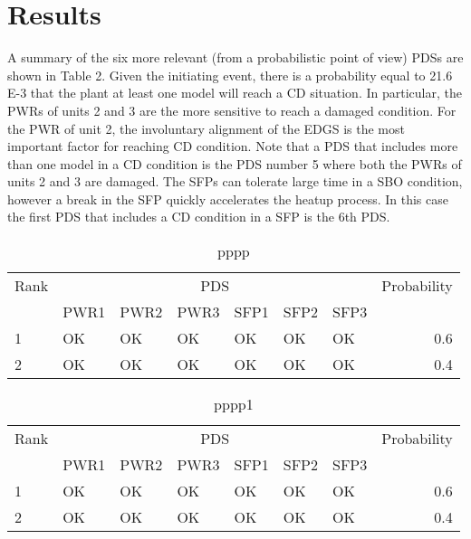 \section{Results}
\label{sec:results}

A summary of the six more relevant (from a probabilistic point of view) PDSs are shown in Table 2. 
Given the initiating event, there is a probability equal to 21.6 E-3 that the plant at least one model 
will reach a CD situation. In particular, the PWRs of units 2 and 3 are the more sensitive to reach a 
damaged condition. For the PWR of unit 2, the involuntary alignment of the EDGS is the most important 
factor for reaching CD condition.
Note that a PDS that includes more than one model in a CD condition is the PDS number 5 where both the 
PWRs of units 2 and 3 are damaged.
The SFPs can tolerate large time in a SBO condition, however a break in the SFP quickly accelerates 
the heatup process. In this case the first PDS that includes a CD condition in a SFP is the 6th PDS.

\begin{table}
  \centering
  \begin{tabular}{lllllllr}
    \hline
    Rank & \multicolumn{6}{c}{PDS} & Probability           \\
    \cline{2-7}
         & PWR1 & PWR2 & PWR3 & SFP1 & SFP2 & SFP3 &       \\
    \hline \hline
     1   & OK   & OK   & OK   & OK   & OK   & OK   & 0.6   \\
     2   & OK   & OK   & OK   & OK   & OK   & OK   & 0.4   \\
    \hline
  \end{tabular}
  \caption{pppp}
  \label{tab:resultsMain}
\end{table}

\begin{table}
  \centering
  \begin{tabular}{lllllllr}
    \hline
    Rank & \multicolumn{6}{c}{PDS} & Probability           \\
    \cline{2-7}
         & PWR1 & PWR2 & PWR3 & SFP1 & SFP2 & SFP3 &       \\
    \hline \hline
     1   & OK   & OK   & OK   & OK   & OK   & OK   & 0.6   \\
     2   & OK   & OK   & OK   & OK   & OK   & OK   & 0.4   \\
    \hline
  \end{tabular}
  \caption{pppp1}
  \label{tab:results1}
\end{table}


